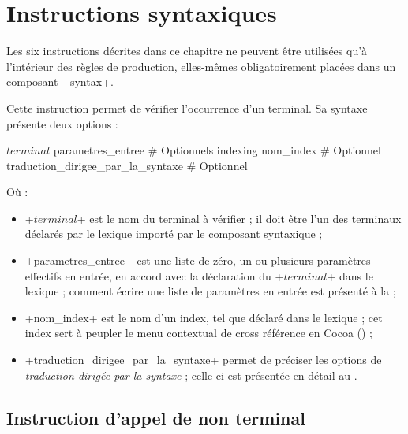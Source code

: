
\chapter{Instructions syntaxiques}



Les six instructions décrites dans ce chapitre ne peuvent être utilisées qu'à l'intérieur des règles de production, elles-mêmes obligatoirement placées dans un composant \ggsq+syntax+.




Cette instruction permet de vérifier l'occurrence d'un terminal. Sa syntaxe présente deux options :
\begin{galgas4}
$terminal$
parametres_entree # Optionnels
indexing nom_index # Optionnel
traduction_dirigee_par_la_syntaxe # Optionnel
\end{galgas4}

Où :
\begin{itemize}
  \item \ggsq+$terminal$+ est le nom du terminal à vérifier ; il doit être l'un des terminaux déclarés par le lexique importé par le composant syntaxique ;
  \item \ggsq+parametres_entree+ est une liste de zéro, un ou plusieurs paramètres effectifs en entrée, en accord avec la déclaration du \ggsq+$terminal$+ dans le lexique ; comment écrire une liste de paramètres en entrée est présenté à la  ;
  \item \ggsq+nom_index+ est le nom d'un index, tel que déclaré dans le lexique ; cet index sert à peupler le menu contextual de cross référence en Cocoa () ;
  \item \ggsq+traduction_dirigee_par_la_syntaxe+ permet de préciser les options de \emph{traduction dirigée par la syntaxe} ; celle-ci est présentée en détail au .
\end{itemize}






\section{Instruction d'appel de non terminal}





